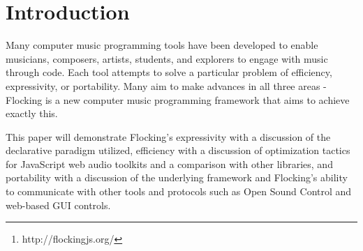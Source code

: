 \documentclass{article}
\title{\papertitle}
\begin{document}
\sloppy
%
\capstartfalse
\maketitle
\capstarttrue
%
\begin{abstract}
Flocking\footnote{http://flockingjs.org/} is a framework for audio synthesis and music composition written in JavaScript. It takes a unique approach to solving several of the common architectural problems faced by computer music environments, emphasizing a declarative style that is closely aligned with the principles of the web.

In Flocking, instruments and scores are defined as JavaScript Object Notation (JSON) objects. JSON is a subset of the JavaScript language that is used widely across the web for exchanging data. Flocking's goal is to enable the growth of an ecosystem of tools that can easily parse and understand the logic and semantics of digital instruments by representing the basic building blocks of synthesis declaratively. This is particularly useful for supporting generative composition (where programs generate new instruments and scores algorithmically), graphical tools (for programmers and non-programmers alike to collaborate), and new modes of social programming that allow musicians to easily adapt, extend, and rework existing instruments without having to ``fork" their code.

Flocking provides a robust, optimized, and well-tested architecture that explicitly supports extensibility and long-term growth. Flocking runs in nearly any modern JavaScript environment, including desktop and mobile browsers (Chrome, Firefox, and Safari), as well as on embedded devices with Node.js.

\end{abstract}

\section{Introduction}\label{sec:introduction}

Many computer music programming tools have been developed to enable musicians, composers, artists, students, and explorers to engage with music through code. Each tool attempts to solve a particular problem of efficiency, expressivity, or portability. Many aim to make advances in all three areas - Flocking is a new computer music programming framework that aims to achieve exactly this.

This paper will demonstrate Flocking's expressivity with a discussion of the declarative paradigm utilized, efficiency with a discussion of optimization tactics for JavaScript web audio toolkits and a comparison with other libraries, and portability with a discussion of the underlying framework and Flocking's ability to communicate with other tools and protocols such as Open Sound Control and web-based GUI controls.
\end{document}
